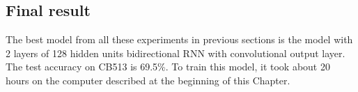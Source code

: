 \subsection{Final result}
The best model from all these experiments in previous sections is the model with 2 layers of 128 hidden units bidirectional RNN with convolutional output layer. The test accuracy on CB513 is 69.5\%. To train this model, it took about 20 hours on the computer described at the beginning of this Chapter. \par

